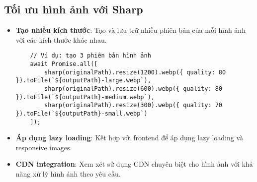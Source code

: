 \subsection{Tối ưu hình ảnh với Sharp}
\begin{itemize}
    \item \textbf{Tạo nhiều kích thước}: Tạo và lưu trữ nhiều phiên bản của mỗi hình ảnh với các kích thước khác nhau.
    \begin{verbatim}
    // Ví dụ: tạo 3 phiên bản hình ảnh
    await Promise.all([
        sharp(originalPath).resize(1200).webp({ quality: 80 }).toFile(`${outputPath}-large.webp`),
        sharp(originalPath).resize(600).webp({ quality: 80 }).toFile(`${outputPath}-medium.webp`),
        sharp(originalPath).resize(300).webp({ quality: 70 }).toFile(`${outputPath}-small.webp`)
    ]);
    \end{verbatim}
    \item \textbf{Áp dụng lazy loading}: Kết hợp với frontend để áp dụng lazy loading và responsive images.
    \item \textbf{CDN integration}: Xem xét sử dụng CDN chuyên biệt cho hình ảnh với khả năng xử lý hình ảnh theo yêu cầu.
\end{itemize}
